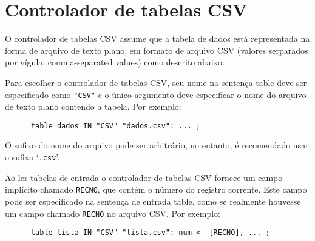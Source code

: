 \documentclass[11pt, brazil]{report}
\begin{document}
%
%
%

\vspace*{-8pt}

\section{Controlador de tabelas CSV}

O controlador de tabelas CSV assume que a tabela de dados está representada
na forma de \linebreak arquivo de texto plano, em formato de arquivo CSV
(valores serparados por vígula: \linebreak comma-separated values) como descrito
abaixo.

Para escolher o controlador de tabelas CSV, seu nome na sentença table deve ser
especificado como \verb|"CSV"| e o único argumento deve especificar o nome do
arquivo de texto plano contendo a tabela. Por exemplo:

\begin{verbatim}
      table dados IN "CSV" "dados.csv": ... ;
\end{verbatim}

O sufixo do nome do arquivo pode ser arbitrário, no entanto,
é recomendado usar o sufixo `\verb|.csv|'.

Ao ler tabelas de entrada o controlador de tabelas CSV fornece um campo
implícito chamado \verb|RECNO|, que contém o número do registro corrente.
Este campo pode ser especificado na sentença de entrada table, como
se realmente houvesse um campo chamado \verb|RECNO| no arquivo CSV. Por exemplo:

\begin{verbatim}
      table lista IN "CSV" "lista.csv": num <- [RECNO], ... ;
\end{verbatim}
\end{document}
